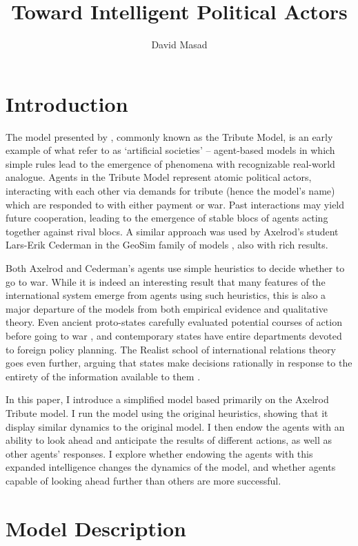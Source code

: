 \documentclass{article}
\begin{document}
\title{Toward Intelligent Political Actors}
	\author{David Masad}
	\maketitle

\section{Introduction}
The model presented by \citet{axelrod_1997}, commonly known as the Tribute Model, is an early example of what \citet{epstein_1996} refer to as `artificial societies' -- agent-based models in which simple rules lead to the emergence of phenomena with recognizable real-world analogue. Agents in the Tribute Model represent atomic political actors, interacting with each other via demands for tribute (hence the model's name) which are responded to with either payment or war. Past interactions may yield future cooperation, leading to the emergence of stable blocs of agents acting together against rival blocs. A similar approach was used by Axelrod's student Lars-Erik Cederman in the GeoSim family of models \citep{cederman_2003}, also with rich results.

Both Axelrod and Cederman's agents use simple heuristics to decide whether to go to war. While it is indeed an interesting result that many features of the international system emerge from agents using such heuristics, this is also a major departure of the models from both empirical evidence and qualitative theory. Even ancient proto-states carefully evaluated potential courses of action before going to war \citep{sheldon_1989}, and contemporary states have entire departments devoted to foreign policy planning. The Realist school of international relations theory goes even further, arguing that states make decisions rationally in response to the entirety of the information available to them \citep{waltz_2010}. 

In this paper, I introduce a simplified model based primarily on the Axelrod Tribute model. I run the model using the original heuristics, showing that it display similar dynamics to the original model. I then endow the agents with an ability to look ahead and anticipate the results of different actions, as well as other agents' responses. I explore whether endowing the agents with this expanded intelligence changes the dynamics of the model, and whether agents capable of looking ahead further than others are more successful. 

\section{Model Description}
\end{document}
